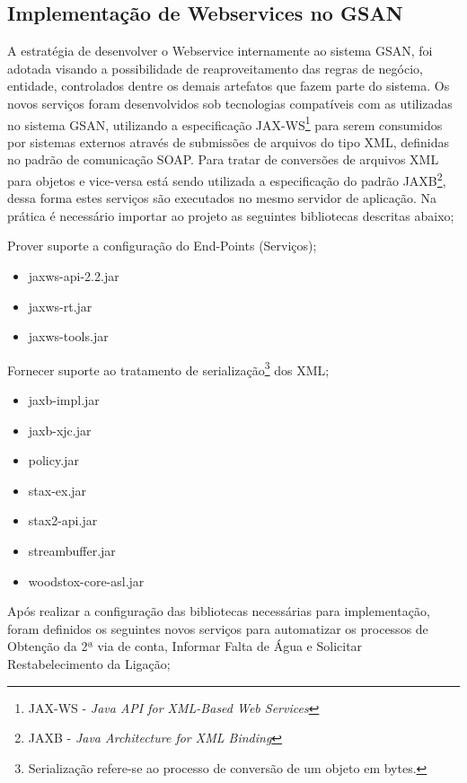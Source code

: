 \subsection{Implementação de Webservices no GSAN}

A estratégia de desenvolver o Webservice internamente ao sistema GSAN, foi adotada visando a possibilidade de reaproveitamento das regras de negócio, entidade, controlados dentre os demais artefatos que fazem parte do sistema.  Os novos serviços foram desenvolvidos sob tecnologias compatíveis com as utilizadas no sistema GSAN, utilizando a especificação JAX-WS\footnote{JAX-WS - \textit{Java API for XML-Based Web Services}}  para serem consumidos por sistemas externos através de submissões de arquivos do tipo XML, definidas no padrão de comunicação SOAP. Para tratar de conversões de arquivos XML para objetos e vice-versa está sendo utilizada a especificação do padrão JAXB\footnote{JAXB - \textit{Java Architecture for XML Binding}}, dessa forma estes serviços são executados no mesmo servidor de aplicação.
Na prática é necessário importar ao projeto as seguintes bibliotecas descritas abaixo;

 Prover suporte a configuração do End-Points (Serviços);
	\begin{itemize}
		\item jaxws-api-2.2.jar
		\item jaxws-rt.jar
		\item jaxws-tools.jar		
	\end{itemize}
	Fornecer suporte ao tratamento de serialização\footnote{Serialização refere-se ao processo de conversão de um objeto em bytes.} dos XML;
	\begin{itemize}
		\item jaxb-impl.jar
		\item jaxb-xjc.jar
		\item policy.jar
		\item stax-ex.jar
		\item stax2-api.jar
		\item streambuffer.jar
		\item woodstox-core-asl.jar		
	\end{itemize}


Após realizar a configuração das bibliotecas necessárias para implementação, foram definidos os seguintes novos serviços para automatizar os processos de Obtenção da 2ª via de conta, Informar Falta de Água e Solicitar Restabelecimento da Ligação;

